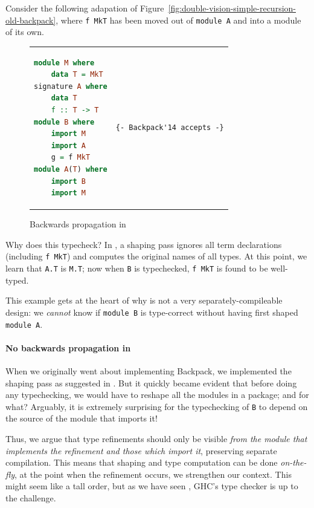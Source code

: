 Consider the following adapation of
Figure~\ref{fig:double-vision-simple-recursion-old-backpack}, where
\verb|f MkT| has been moved out of \verb|module A| and into a module of
its own.

\begin{figure}[H]
\begin{tabular}{p{} p{}}
\begin{lstlisting}[language=Haskell,escapechar=@]
module M where
    data T = MkT
signature A where
    data T
    f :: T -> T
module B where
    import M
    import A
    g = f MkT
module A(T) where
    import B
    import M
\end{lstlisting}
&
\begin{verbatim}
{- Backpack'14 accepts -}
\end{verbatim}
\end{tabular}
\caption{Backwards propagation in \OldBackpack{}}
\label{fig:double-vision-backwards-propagating-old-backpack}
\end{figure}

\noindent
Why does this typecheck?  In \OldBackpack{}, a shaping pass ignores
all term declarations (including \verb|f MkT|) and computes the
original names of all types.  At this point, we learn that \verb|A.T|
is \verb|M.T|; now when \verb|B| is typechecked, \verb|f MkT| is found
to be well-typed.

This example gets at the heart of why \OldBackpack{} is not a very
separately-compileable design: we \emph{cannot} know if \verb|module B| is
type-correct without having first shaped \verb|module A|.

\paragraph{No backwards propagation in \Backpack{}}  When we originally
went about implementing Backpack, we implemented the shaping pass
as suggested in \OldBackpack{}.  But it quickly became evident that before
doing any typechecking, we would have to reshape all the modules in a package;
and for what?  Arguably, it is extremely surprising for the typechecking of
\verb|B| to depend on the source of the module that imports it!

Thus, we argue that type refinements should only be visible \emph{from the
module that implements the refinement and those which import it},
preserving separate compilation.  This means that shaping and type
computation can be done \emph{on-the-fly}, at the point when the refinement
occurs, we strengthen our context.  This might seem like a tall order,
but as we have seen , GHC's type checker is up to the challenge.

